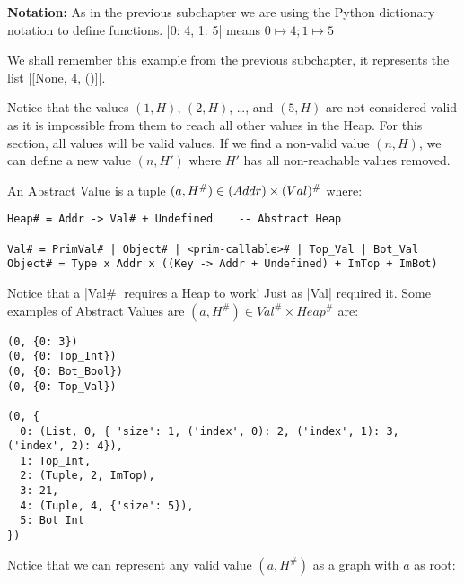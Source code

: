 \textbf{Notation:} As in the previous subchapter we are using the Python
dictionary notation to define functions. \pycode|{0: 4, 1: 5}|
means \(0 \mapsto 4; 1 \mapsto 5\)

We shall remember this example from the previous subchapter, it
represents the list \pycode|[None, 4, ()]|.

Notice that the values \((1, H)\), \((2, H)\), \ldots{}, and \((5, H)\)
are not considered valid as it is impossible from them to reach all
other values in the Heap. For this section, all values will be valid
values. If we find a non-valid value \((n, H)\), we can define a new
value \((n, H')\) where \(H'\) has all non-reachable values removed.

{}

An Abstract Value is a tuple
\((a, H^\#) \in \text(Addr) \times \text(Val)^\#\) where:

\begin{verbatim}
Heap# = Addr -> Val# + Undefined    -- Abstract Heap

Val# = PrimVal# | Object# | <prim-callable># | Top_Val | Bot_Val
Object# = Type x Addr x ((Key -> Addr + Undefined) + ImTop + ImBot)
\end{verbatim}

Notice that a \pycode|Val#| requires a Heap to work! Just as
\pycode|Val| required it. Some examples of Abstract Values are
\((a, H^\#) \in Val^\# \times Heap^\#\) are:

\begin{verbatim}
(0, {0: 3})
(0, {0: Top_Int})
(0, {0: Bot_Bool})
(0, {0: Top_Val})

(0, {
  0: (List, 0, { 'size': 1, ('index', 0): 2, ('index', 1): 3, ('index', 2): 4}),
  1: Top_Int,
  2: (Tuple, 2, ImTop),
  3: 21,
  4: (Tuple, 4, {'size': 5}),
  5: Bot_Int
})
\end{verbatim}

Notice that we can represent any valid value \((a, H^\#)\) as a graph
with \(a\) as root:

{}

